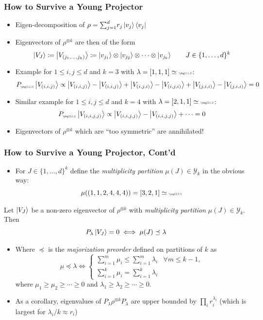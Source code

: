 \documentclass[
    9pt,
    hyperref={bookmarks=false, colorlinks=false}, %
    xcolor={dvipsnames},
]{beamer}
\begin{document}
\begin{frame}
    \frametitle{How to Survive a Young Projector}
    \begin{itemize}
        \item Eigen-decomposition of $\rho = {\sum}_{j=1}^{d} r_j \ket{v_j} \bra{v_j}$
        \item Eigenvectors of $\rho^{\otimes k}$ are then of the form
            \[ \ket{V_{J}} \coloneqq \ket{V_{(j_1, \ldots, j_k)}} \coloneqq \ket{v_{j_1}}\otimes\ket{v_{j_2}}\otimes \cdots \otimes\ket{v_{j_k}}\qquad J \in \{ 1, \ldots, d\}^{k} \]
        \item Example for $1 \leq i, j \leq d$ and $k=3$ with $\lambda = [1,1,1] \simeq \scalebox{0.4}{\yng(1,1,1)}$:
            \[ P_{\scalebox{0.4}{\yng(1,1,1)}} \ket{V_{(i, i, j)}} \propto \ket{V_{(i, i, j)}} - \ket{V_{(i, i, j)}} + \ket{V_{(i, j, i)}} - \ket{V_{(i, j, i)}}+\ket{V_{(j, i, i)}} - \ket{V_{(j, i, i)}} = 0\]
        \item Similar example for $1 \leq i, j \leq d$ and $k=4$ with $\lambda = [2,1,1] \simeq \scalebox{0.4}{\yng(2,1,1)}$:
            \[ P_{\scalebox{0.4}{\yng(2,1,1)}} \ket{V_{(i, i, j, j)}} \propto \ket{V_{(i, i, j, j)}} - \ket{V_{(i, i, j, j)}} + \cdots = 0\]
        \item Eigenvectors of $\rho^{\otimes k}$ which are ``too symmetric'' are annihilated!
    \end{itemize}
\end{frame}

\begin{frame}
    \frametitle{How to Survive a Young Projector, Cont'd}
    \begin{itemize}
        \item For $J \in \{1, \ldots, d\}^{k}$ define the \textit{multiplicity partition} $\mu(J) \in \mathcal Y_k$ in the obvious way:
            \[ \mu((1,1,2,4,4,4)) = [3, 2, 1] \simeq \scalebox{0.4}{\yng(3,2,1)} \]
    \end{itemize}
    \begin{theorem}
        Let $\ket{V_J}$ be a non-zero eigenvector of $\rho^{\otimes k}$ with \textit{multiplicity partition} $\mu(J) \in \mathcal Y_k$. Then
        \[ P_\lambda \ket{V_J} = 0 \iff \mu(J) \preceq \lambda \]
    \end{theorem}
    \begin{itemize}
        \item Where $\preceq$ is the \textit{majorization preorder} defined on partitions of $k$ as
            \[ \mu \preceq \lambda \iff \begin{cases} \sum_{i=1}^{m} \mu_{i} \leq \sum_{i=1}^{m} \lambda_{i} & \forall m \leq k-1, \\ \sum_{i=1}^{k} \mu_{i} = \sum_{i=1}^{k} \lambda_{i} \end{cases} \]
        where $\mu_1 \geq \mu_2 \geq \cdots \geq 0$ and $\lambda_1 \geq \lambda_2 \geq \cdots \geq 0$.
        \item As a corollary, eigenvalues of $P_\lambda \rho^{\otimes k} P_{\lambda}$ are upper bounded by $\prod_{i} r_i^{\lambda_i}$ (which is largest for $\lambda_i/k \approx r_i$)
    \end{itemize}
\end{frame}
\end{document}
